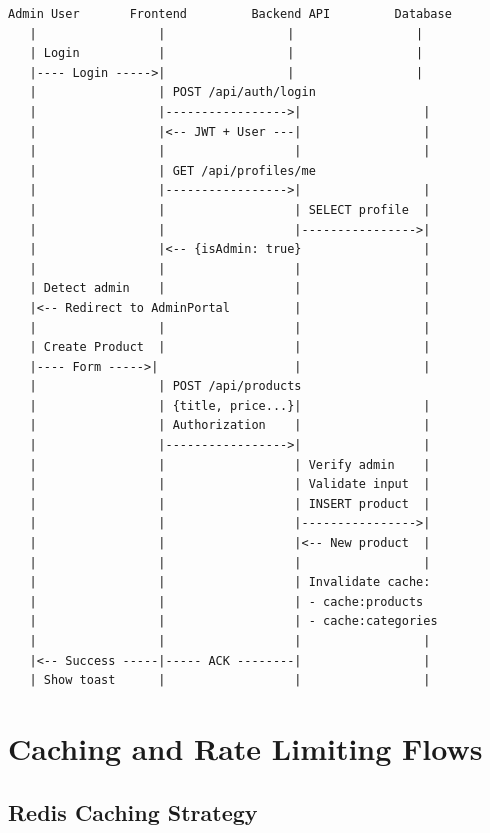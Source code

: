 \documentclass[12pt,a4paper]{report}
\begin{document}
\begin{lstlisting}[language=text, caption=Admin Product Creation and Management]
Admin User       Frontend         Backend API         Database
   |                 |                 |                 |
   | Login           |                 |                 |
   |---- Login ----->|                 |                 |
   |                 | POST /api/auth/login
   |                 |----------------->|                 |
   |                 |<-- JWT + User ---|                 |
   |                 |                  |                 |
   |                 | GET /api/profiles/me
   |                 |----------------->|                 |
   |                 |                  | SELECT profile  |
   |                 |                  |---------------->|
   |                 |<-- {isAdmin: true}                 |
   |                 |                  |                 |
   | Detect admin    |                  |                 |
   |<-- Redirect to AdminPortal         |                 |
   |                 |                  |                 |
   | Create Product  |                  |                 |
   |---- Form ----->|                   |                 |
   |                 | POST /api/products
   |                 | {title, price...}|                 |
   |                 | Authorization    |                 |
   |                 |----------------->|                 |
   |                 |                  | Verify admin    |
   |                 |                  | Validate input  |
   |                 |                  | INSERT product  |
   |                 |                  |---------------->|
   |                 |                  |<-- New product  |
   |                 |                  |                 |
   |                 |                  | Invalidate cache:
   |                 |                  | - cache:products
   |                 |                  | - cache:categories
   |                 |                  |                 |
   |<-- Success -----|----- ACK --------|                 |
   | Show toast      |                  |                 |
\end{lstlisting}

\section{Caching and Rate Limiting Flows}

\subsection{Redis Caching Strategy}
\end{document}
